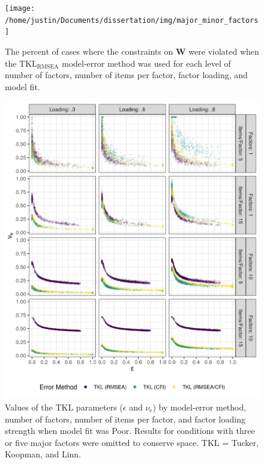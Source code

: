 \documentclass[11pt]{umnthesis}
\begin{document}
\begin{figure}

{\centering \texttt{[image: /home/justin/Documents/dissertation/img/major\_minor\_factors]} 

}

\caption[The percent of cases where the constraints on $\mathbf{W}$ were violated when the $\textrm{TKL}_{\textrm{RMSEA}}$ model-error method was used for each level of number of factors, number of items per factor, factor loading, and model fit]{The percent of cases where the constraints on $\mathbf{W}$ were violated when the $\textrm{TKL}_{\textrm{RMSEA}}$ model-error method was used for each level of number of factors, number of items per factor, factor loading, and model fit.}\label{fig:w-major-factors-plot}
\end{figure}

\begin{figure}

{\centering \includegraphics[width=0.8\linewidth]{img/eps_and_nu_w_violations} 

}

\caption[Values of the TKL parameters ($\epsilon$ and $\nu_{\textrm{e}}$) by model-error method, number of factors, number of items per factor, and factor loading strength when model fit was Poor]{Values of the TKL parameters ($\epsilon$ and $\nu_{\textrm{e}}$) by model-error method, number of factors, number of items per factor, and factor loading strength when model fit was Poor. Results for conditions with three or five major factors were omitted to conserve space. TKL = Tucker, Koopman, and Linn.}\label{fig:eps-and-v-values-by-W-violations}
\end{figure}
\end{document}
